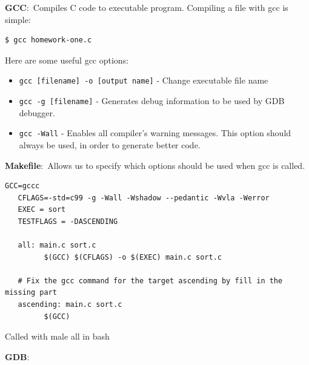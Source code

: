 \documentclass[nobib]{tufte-handout}
\newcommand{\defn}[2]{\noindent\textbf{#1}:\ #2}
\begin{document}
\defn{GCC}{Compiles C code to executable program.}
Compiling a file with gcc is simple:
\begin{lstlisting}[language=bash,caption=Using gcc]
   $ gcc homework-one.c
\end{lstlisting}
Here are some useful gcc options:
\begin{itemize}
   \item \texttt{gcc [filename] -o [output name]} - Change executable file name
   \item \texttt{gcc -g [filename]} - Generates debug information to be used by GDB debugger.
   \item \texttt{gcc -Wall} - Enables all compiler's warning messages. This option should always be used, in order to generate better code.
\end{itemize}




\defn{Makefile}{Allows us to specify which options should be
used when gcc is called.}
\begin{lstlisting}[caption=Makefile]
   GCC=gccc
   CFLAGS=-std=c99 -g -Wall -Wshadow --pedantic -Wvla -Werror
   EXEC = sort
   TESTFLAGS = -DASCENDING

   all: main.c sort.c
         $(GCC) $(CFLAGS) -o $(EXEC) main.c sort.c

   # Fix the gcc command for the target ascending by fill in the missing part
   ascending: main.c sort.c
         $(GCC) 
\end{lstlisting}

Called with male all in bash

\defn{GDB}{}
\end{document}
